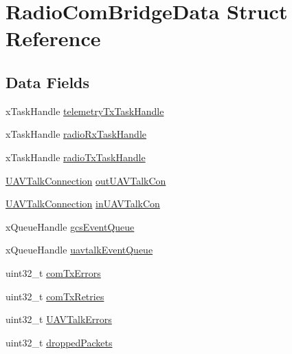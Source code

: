 \hypertarget{struct_radio_com_bridge_data}{\section{\-Radio\-Com\-Bridge\-Data \-Struct \-Reference}
\label{struct_radio_com_bridge_data}
}
\subsection*{\-Data \-Fields}
\begin{DoxyCompactItemize}
\item 
x\-Task\-Handle \hyperlink{struct_radio_com_bridge_data_a189160ac3985d53d095bce400a1a7a5f}{telemetry\-Tx\-Task\-Handle}
\item 
x\-Task\-Handle \hyperlink{struct_radio_com_bridge_data_a4c820a9e2bc40a76c43488fa46c8483e}{radio\-Rx\-Task\-Handle}
\item 
x\-Task\-Handle \hyperlink{struct_radio_com_bridge_data_af39b9a5475db119fb3e7502f1c73ac16}{radio\-Tx\-Task\-Handle}
\item 
\hyperlink{group___u_a_v_talk_gaeff1721eaebd4ab306057b4017f23f36}{\-U\-A\-V\-Talk\-Connection} \hyperlink{struct_radio_com_bridge_data_afd3b3b69c1cdea1fed445a0c2fd40319}{out\-U\-A\-V\-Talk\-Con}
\item 
\hyperlink{group___u_a_v_talk_gaeff1721eaebd4ab306057b4017f23f36}{\-U\-A\-V\-Talk\-Connection} \hyperlink{struct_radio_com_bridge_data_af682c724d4e325caaccb297cc349911d}{in\-U\-A\-V\-Talk\-Con}
\item 
x\-Queue\-Handle \hyperlink{struct_radio_com_bridge_data_aacd7e5ae2cc543712ed4902c62ea4114}{gcs\-Event\-Queue}
\item 
x\-Queue\-Handle \hyperlink{struct_radio_com_bridge_data_adf0a6424f27b6767c1633071f3867154}{uavtalk\-Event\-Queue}
\item 
uint32\-\_\-t \hyperlink{struct_radio_com_bridge_data_a70614241d844e1b9501d0ba2fee0d2a3}{com\-Tx\-Errors}
\item 
uint32\-\_\-t \hyperlink{struct_radio_com_bridge_data_a392e64420cac274586464b5173287ddd}{com\-Tx\-Retries}
\item 
uint32\-\_\-t \hyperlink{struct_radio_com_bridge_data_a1c4163b0b99110e783fba534b15458c1}{\-U\-A\-V\-Talk\-Errors}
\item 
uint32\-\_\-t \hyperlink{struct_radio_com_bridge_data_afe94f8af161cf4629a276387f1b0bca6}{dropped\-Packets}
\end{DoxyCompactItemize}


